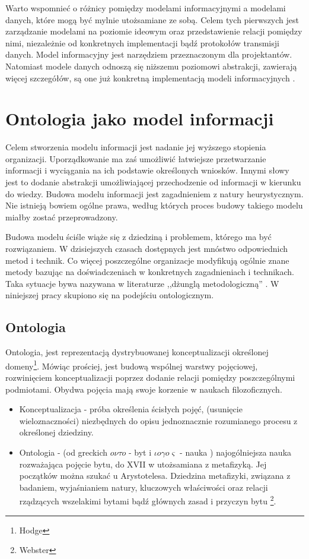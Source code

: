 Warto wspomnieć o różnicy pomiędzy modelami informacyjnymi a modelami danych,
które mogą być mylnie utożsamiane ze sobą. Celem tych pierwszych jest 
zarządzanie modelami na poziomie ideowym oraz przedstawienie relacji pomiędzy
nimi, niezależnie od konkretnych implementacji bądź protokołów transmisji
danych. Model informacyjny jest narzędziem przeznaczonym dla projektantów.
Natomiast modele danych odnoszą się niższemu poziomowi abstrakcji, zawierają
więcej szczegółów, są one już konkretną implementacją modeli informacyjnych 
\cite{RFC3444}.



\section{Ontologia jako model informacji}
Celem stworzenia modelu informacji jest nadanie jej wyższego stopienia organizacji. Uporządkowanie ma zaś umożliwić łatwiejsze przetwarzanie informacji i wyciągania na ich podstawie określonych wniosków. Innymi słowy jest to dodanie abstrakcji umożliwiającej przechodzenie od informacji w kierunku do wiedzy. Budowa modelu informacji jest zagadnieniem z natury heurystycznym. Nie istnieją bowiem ogólne prawa, według których proces budowy takiego modelu miałby zostać przeprowadzony. 

Budowa modelu ściśle wiąże się z dziedziną i problemem, którego ma być rozwiązaniem. W dzisiejszych czasach dostępnych jest mnóstwo odpowiednich metod i technik. Co więcej poszczególne organizacje modyfikują ogólnie znane metody bazując na doświadczeniach w konkretnych zagadnieniach i technikach. Taka sytuacje bywa nazywana w literaturze ,,dżunglą metodologiczną'' \cite{Verhoef}. W niniejszej pracy skupiono się na podejściu ontologicznym.

\subsection{Ontologia}
Ontologia, jest reprezentacją dystrybuowanej konceptualizacji określonej domeny\footnote{Hodge}. Mówiąc prościej, jest budową wspólnej warstwy pojęciowej, rozwinięciem konceptualizacji poprzez dodanie relacji pomiędzy poszczególnymi podmiotami. Obydwa pojęcia mają swoje korzenie w naukach filozoficznych.
\begin{itemize}
   \item Konceptualizacja - próba określenia ścisłych pojęć, (usunięcie wieloznaczności) niezbędnych do opisu jednoznacznie rozumianego procesu z określonej dziedziny.
	\item Ontologia - (od greckich $o \nu \tau o$ - byt i $\iota o\gamma o\varsigma$ - nauka ) najogólniejsza nauka rozważająca pojęcie bytu, do XVII w utożsamiana z metafizyką. Jej początków można szukać u Arystotelesa. Dziedzina metafizyki, związana z badaniem, wyjaśnianiem natury, kluczowych właściwości oraz relacji rządzących wszelakimi bytami bądź głównych zasad i przyczyn bytu \footnote{Webster}.
\end{itemize}  

